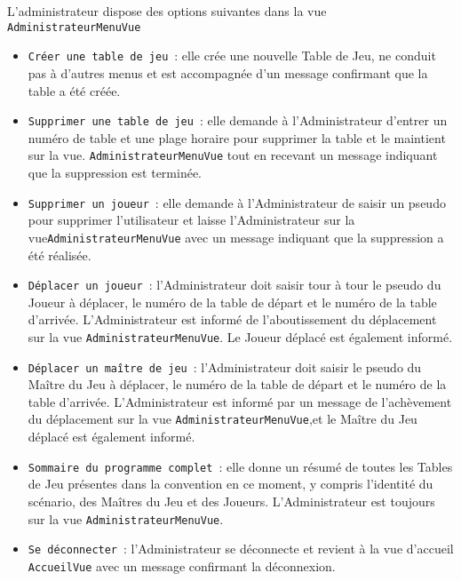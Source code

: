 \documentclass[11pt]{article}
\begin{document}
L'administrateur dispose des options suivantes dans la vue \texttt{AdministrateurMenuVue}
\begin{itemize}[label=, font=\small]
    \item \texttt{Créer une table de jeu}~: elle crée une nouvelle Table de Jeu, ne conduit pas à d'autres menus et est accompagnée d'un message confirmant que la table a été créée.
    \item \texttt{Supprimer une table de jeu}~: elle demande à l'Administrateur d'entrer un numéro de table et une plage horaire pour supprimer la table et le maintient sur la vue. \texttt{AdministrateurMenuVue} tout en recevant un message indiquant que la suppression est terminée.
    \item \texttt{Supprimer un joueur}~: elle demande à l'Administrateur de saisir un pseudo pour supprimer l'utilisateur et laisse l'Administrateur sur la vue\texttt{AdministrateurMenuVue} avec un message indiquant que la suppression a été réalisée.
    \item \texttt{Déplacer un joueur}~: l'Administrateur doit saisir tour à tour le pseudo du Joueur à déplacer, le numéro de la table de départ et le numéro de la table d'arrivée. L'Administrateur est informé de l'aboutissement du déplacement sur la vue \texttt{AdministrateurMenuVue}. Le Joueur déplacé est également informé.
    \item \texttt{Déplacer un maître de jeu}~: l'Administrateur doit saisir le pseudo du Maître du Jeu à déplacer, le numéro de la table de départ et le numéro de la table d'arrivée. L'Administrateur est informé par un message de l'achèvement du déplacement sur la vue \texttt{AdministrateurMenuVue},et le Maître du Jeu déplacé est également informé.
    \item \texttt{Sommaire du programme complet}~: elle donne un résumé de toutes les Tables de Jeu présentes dans la convention en ce moment, y compris l'identité du scénario, des Maîtres du Jeu et des Joueurs. L'Administrateur est toujours sur la vue \texttt{AdministrateurMenuVue}.
    \item \texttt{Se déconnecter}~: l'Administrateur se déconnecte et revient à la vue d'accueil \texttt{AccueilVue} avec un message confirmant la déconnexion.
\end{itemize}
\bigbreak
\end{document}
